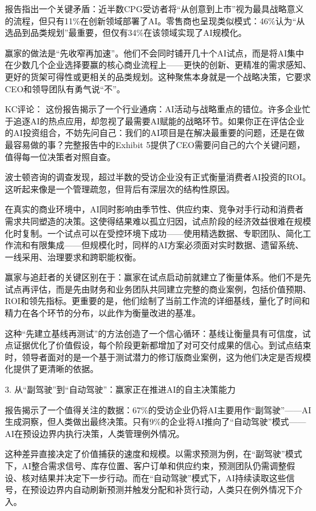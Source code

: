 \documentclass[11pt]{ctexart}
\begin{document}
报告指出一个关键矛盾：近半数CPG受访者将“从创意到上市”视为最具战略意义的流程，但只有11\%在创新领域部署了AI。零售商也呈现类似模式：46\%认为“从选品到品类规划”最重要，但仅有34\%在该领域实现了AI规模化。

赢家的做法是“先收窄再加速”。他们不会同时铺开几十个AI试点，而是将AI集中在少数几个企业选择要赢的核心商业流程上——更快的创新、更精准的需求感知、更好的货架可得性或更相关的品类规划。这种聚焦本身就是一个战略决策，它要求CEO和领导团队有勇气说“不”。

KC评论： 这份报告揭示了一个行业通病：AI活动与战略重点的错位。许多企业忙于追逐AI的热点应用，却忽视了最需要AI赋能的战略环节。如果你正在评估企业的AI投资组合，不妨先问自己：我们的AI项目是在解决最重要的问题，还是在做最容易做的事？完整报告中的Exhibit 5提供了CEO需要问自己的六个关键问题，值得每一位决策者对照自查。

波士顿咨询的调查发现，超过半数的受访企业没有正式衡量消费者AI投资的ROI。这听起来像是一个管理疏忽，但背后有深层次的结构性原因。

在真实的商业环境中，AI同时影响由季节性、供应约束、竞争对手行动和消费者需求共同塑造的决策。这使得结果难以孤立归因，试点阶段的经济效益很难在规模化时复制。一个试点可以在受控环境下成功——使用精选数据、专职团队、简化工作流和有限集成——但规模化时，同样的AI方案必须面对实时数据、遗留系统、一线采用、治理要求和跨职能权衡。

赢家与追赶者的关键区别在于：赢家在试点启动前就建立了衡量体系。他们不是先试点再评估，而是先由财务和业务团队共同建立完整的商业案例，包括价值预期、ROI和领先指标。更重要的是，他们绘制了当前工作流的详细基线，量化了时间和精力在各个环节的分布，以此作为衡量改进的基准。

这种“先建立基线再测试”的方法创造了一个信心循环：基线让衡量具有可信度，试点证据优化了价值假设，每个阶段更新都增加了对可交付成果的信心。到试点结束时，领导者面对的是一个基于测试潜力的修订版商业案例，这为他们决定是否规模化提供了更清晰的依据。

3. 从“副驾驶”到“自动驾驶”：赢家正在推进AI的自主决策能力

报告揭示了一个值得关注的数据：67\%的受访企业仍将AI主要用作“副驾驶”——AI生成洞察，但人类做出最终决策。只有9\%的企业将AI推向了“自动驾驶”模式——AI在预设边界内执行决策，人类管理例外情况。

这种差异直接决定了价值捕获的速度和规模。以需求预测为例，在“副驾驶”模式下，AI整合需求信号、库存位置、客户订单和供应约束，预测团队仍需调整假设、核对结果并决定下一步行动。而在“自动驾驶”模式下，AI持续读取这些信号，在预设边界内自动刷新预测并触发分配和补货行动，人类只在例外情况下介入。
\end{document}
